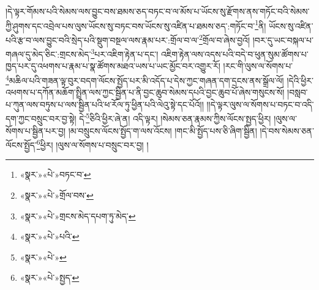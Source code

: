 །དེ་ལྟར་གོམས་པའི་སེམས་ལས་བྱུང་བས་ཐམས་ཅད་བཏང་བ་ལ་མོས་པ་ཡོངས་སུ་རྫོགས་ནས་གཏོང་བའི་སེམས་ཀྱི་ཤུགས་དང་འབྲེལ་པས་ལུས་ཡོངས་སུ་བཏང་བས་ཡོངས་སུ་འཛིན་པ་ཐམས་ཅད་:གཏོང་བ་\footnote{«སྣར་»«པེ་»བཏང་བ་}ནི། ཡོངས་སུ་འཛིན་པའི་རྩ་བ་ལས་བྱུང་བའི་སྲེད་པའི་སྡུག་བསྔལ་ལས་རྣམ་པར་:གྲོལ་བ་ལ་\footnote{«སྣར་»«པེ་»གྲོལ་བས་}གྲོལ་བ་ཞེས་བྱའོ། །བར་དུ་ཡང་བསྐལ་པ་གཞལ་དུ་མེད་ཅིང་:གྲངས་མེད་\footnote{«སྣར་»«པེ་»གྲངས་མེད་དཔག་ཏུ་མེད་}པར་འཇིག་རྟེན་པ་དང་། འཇིག་རྟེན་ལས་འདས་པའི་བདེ་བ་ཕུན་སུམ་ཚོགས་པ་ཁྱད་པར་དུ་འཕགས་པ་རྣམ་པ་སྣ་ཚོགས་མཐའ་ཡས་པ་ཡང་མྱོང་བར་འགྱུར་རོ། །རང་གི་ལུས་ལ་སོགས་པ་\footnote{«སྣར་»«པེ་»པའི་}མཆིལ་པའི་གཟན་ལྟ་བུར་བདག་ལོངས་སྤྱོད་པར་མི་འདོད་པ་དེས་ཀྱང་གཞན་དག་དྲངས་ནས་སྒྲོལ་ལོ། །དེའི་ཕྱིར་འཕགས་པ་དཀོན་མཆོག་སྤྲིན་ལས་ཀྱང་སྦྱིན་པ་ནི་བྱང་ཆུབ་སེམས་དཔའི་བྱང་ཆུབ་པོ་ཞེས་གསུངས་སོ། །བསླབ་པ་ཀུན་ལས་བཏུས་པ་ལས་སྦྱིན་པའི་ཕ་རོལ་ཏུ་ཕྱིན་པའི་ལེའུ་སྟེ་དང་པོའོ།། །།དེ་ལྟར་ལུས་ལ་སོགས་པ་བཏང་བ་འདི་དག་ཀྱང་བསྲུང་བར་བྱ་སྟེ། དེ་\footnote{«སྣར་»«པེ་»}ཅིའི་ཕྱིར་ཞེ་ན། འདི་ལྟར། །སེམས་ཅན་རྣམས་ཀྱིས་ལོངས་སྤྱད་ཕྱིར། །ལུས་ལ་སོགས་པ་སྦྱིན་པར་བྱ། །མ་བསྲུངས་ལོངས་སྤྱོད་ག་ལས་འོངས། །གང་མི་སྤྱོད་པས་ཅི་ཞིག་སྦྱིན། །དེ་བས་སེམས་ཅན་ལོངས་སྤྱོད་\footnote{«སྣར་»«པེ་»སྤྱད་}ཕྱིར། །ལུས་ལ་སོགས་པ་བསྲུང་བར་བྱ། །
